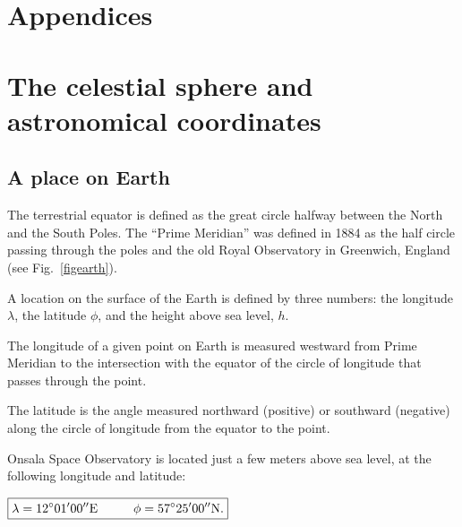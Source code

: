 \chapter*{Appendices}

\appendix

\chapter{The celestial sphere and astronomical coordinates}
\label{app:coord}

\section{A place on Earth}

The terrestrial equator is defined as the great circle halfway between
the North and the South Poles.  The ``Prime Meridian'' was defined in
1884 as the half circle passing through the poles and the old Royal
Observatory in Greenwich, England (see Fig.~\ref{figearth}).

A location on the surface of the Earth is defined by three numbers:
the longitude $\lambda$, the latitude $\phi$, and the height above sea
level, $h$.

The longitude of a given point on Earth is measured westward from
Prime Meridian to the intersection with the equator of the circle of
longitude that passes through the point.

The latitude is the angle measured northward (positive) or southward
(negative) along the circle of longitude from the equator to the
point.

Onsala Space Observatory is located just a few meters above sea level,
at the following longitude and latitude:

\begin{center}
${\bf{\boxed{\lambda=12^{\circ}01'00'' \text{E}
\hspace{1cm}\phi=57^{\circ}25'00''\text{N.} }}}$
\end{center}  

